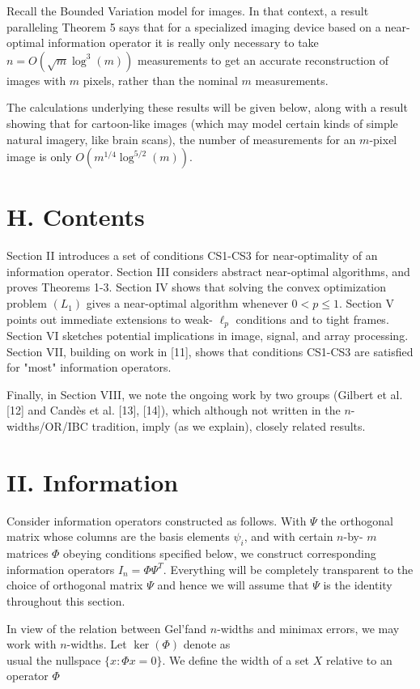 \documentclass[10pt]{article}
\begin{document}
Recall the Bounded Variation model for images. In that context, a result paralleling Theorem 5 says that for a specialized imaging device based on a near-optimal information operator it is really only necessary to take $n=O\left(\sqrt{m} \log ^{3}(m)\right)$ measurements to get an accurate reconstruction of images with $m$ pixels, rather than the nominal $m$ measurements.

The calculations underlying these results will be given below, along with a result showing that for cartoon-like images (which may model certain kinds of simple natural imagery, like brain scans), the number of measurements for an $m$-pixel image is only $O\left(m^{1 / 4} \log ^{5 / 2}(m)\right)$.

\section*{H. Contents}
Section II introduces a set of conditions CS1-CS3 for near-optimality of an information operator. Section III considers abstract near-optimal algorithms, and proves Theorems 1-3. Section IV shows that solving the convex optimization problem $\left(L_{1}\right)$ gives a near-optimal algorithm whenever $0<p \leq 1$. Section V points out immediate extensions to weak- $\ell_{p}$ conditions and to tight frames. Section VI sketches potential implications in image, signal, and array processing. Section VII, building on work in [11], shows that conditions CS1-CS3 are satisfied for "most" information operators.

Finally, in Section VIII, we note the ongoing work by two groups (Gilbert et al. [12] and Candès et al. [13], [14]), which although not written in the $n$-widths/OR/IBC tradition, imply (as we explain), closely related results.

\section*{II. Information}
Consider information operators constructed as follows. With $\Psi$ the orthogonal matrix whose columns are the basis elements $\psi_{i}$, and with certain $n$-by- $m$ matrices $\Phi$ obeying conditions specified below, we construct corresponding information operators $I_{n}=\Phi \Psi^{T}$. Everything will be completely transparent to the choice of orthogonal matrix $\Psi$ and hence we will assume that $\Psi$ is the identity throughout this section.

In view of the relation between Gel'fand $n$-widths and minimax errors, we may work with $n$-widths. Let $\operatorname{ker}(\Phi)$ denote as\\
usual the nullspace $\{x: \Phi x=0\}$. We define the width of a set $X$ relative to an operator $\Phi$
\end{document}
